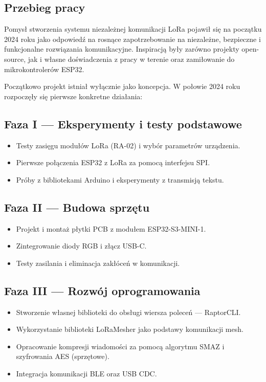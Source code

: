 \subsection{Przebieg pracy}

Pomysł stworzenia systemu niezależnej komunikacji LoRa pojawił się na początku 2024 roku jako odpowiedź na rosnące zapotrzebowanie na niezależne, bezpieczne i funkcjonalne rozwiązania komunikacyjne. Inspiracją były zarówno projekty open-source, jak i własne doświadczenia z pracy w terenie oraz zamiłowanie do mikrokontrolerów ESP32.

Początkowo projekt istniał wyłącznie jako koncepcja. W połowie 2024 roku rozpoczęły się pierwsze konkretne działania:

\subsection*{Faza I --- Eksperymenty i testy podstawowe}

\begin{itemize}
	\item Testy zasięgu modułów LoRa (RA-02) i wybór parametrów urządzenia.
	\item Pierwsze połączenia ESP32 z LoRa za pomocą interfejsu SPI.
	\item Próby z bibliotekami Arduino i eksperymenty z transmisją tekstu.
\end{itemize}

\subsection*{Faza II --- Budowa sprzętu}

\begin{itemize}
	\item Projekt i montaż płytki PCB z modułem ESP32-S3-MINI-1.
	\item Zintegrowanie diody RGB i złącz USB-C.
	\item Testy zasilania i eliminacja zakłóceń w komunikacji.
\end{itemize}

\clearpage
\subsection*{Faza III --- Rozwój oprogramowania}

\begin{itemize}
	\item Stworzenie własnej biblioteki do obsługi wiersza poleceń --- RaptorCLI.
	\item Wykorzystanie biblioteki LoRaMesher jako podstawy komunikacji mesh.
	\item Opracowanie kompresji wiadomości za pomocą algorytmu SMAZ i szyfrowania AES (sprzętowe).
	\item Integracja komunikacji BLE oraz USB CDC.
\end{itemize}

